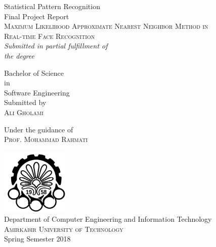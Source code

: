 \begin{titlepage}

\begin{center}

\textup{\large {\sc Statistical Pattern Recognition} \\ \sc \small{Final Project Report}}\\[0.4in]

\Large \textsc {Maximum Likelihood Approximate Nearest Neighbor Method in\\ Real-time Face Recognition}\\[0.5in]

\vspace{0.1in}
       \small \emph{Submitted in partial fulfillment of\\
        the degree}
        \vspace{.2in}

       {\sc Bachelor of Science \\in\\ Software Engineering}\\[0.5in]

\vspace{0.3in}
\normalsize Submitted by\\
\vspace{0.06in}
\textsc{\large Ali Gholami}

\vspace{.3in}
Under the guidance of\\
\vspace{0.06in}
\textsc{\large Prof. Mohammad Rahmati}

\vfill

\includegraphics[width=0.25\textwidth]{nitc-logo}\\[0.1in]
\normalsize{Department of Computer Engineering and Information Technology}\\
\normalsize
\textsc{Amirkabir University of Technology}\\
\vspace{0.5cm}
Spring Semester 2018

\end{center}

\end{titlepage}
